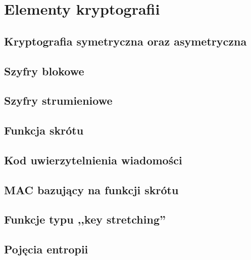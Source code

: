 \chapter{Elementy kryptografii}

\section{Kryptografia symetryczna oraz asymetryczna}
\section{Szyfry blokowe}
\section{Szyfry strumieniowe}
\section{Funkcja skrótu}
\section{Kod uwierzytelnienia wiadomości}
\section{MAC bazujący na funkcji skrótu}
\section{Funkcje typu ,,key stretching''}
\section{Pojęcia entropii}
